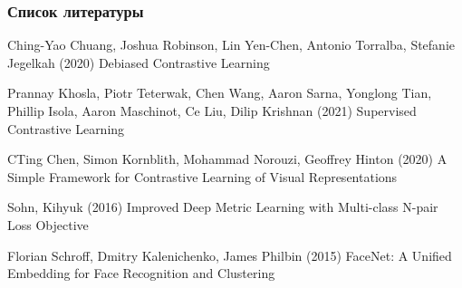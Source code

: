 \documentclass[
	11pt, %
]{beamer}
\begin{document}
\begin{frame} 
	\frametitle{Список литературы}
	
	\begin{thebibliography}{99} 
		\footnotesize
		
			Ching-Yao Chuang, Joshua Robinson, Lin Yen-Chen, Antonio Torralba, Stefanie Jegelkah (2020)
			\newblock Debiased Contrastive Learning

			Prannay Khosla, Piotr Teterwak, Chen Wang, Aaron Sarna, Yonglong Tian, Phillip Isola, Aaron Maschinot, Ce Liu, Dilip Krishnan (2021)
			\newblock Supervised Contrastive Learning

			CTing Chen, Simon Kornblith, Mohammad Norouzi, Geoffrey Hinton (2020)
			\newblock A Simple Framework for Contrastive Learning of Visual Representations

			Sohn, Kihyuk (2016)
			\newblock Improved Deep Metric Learning with Multi-class N-pair Loss Objective

			Florian Schroff, Dmitry Kalenichenko, James Philbin (2015)
			\newblock FaceNet: A Unified Embedding for Face Recognition and Clustering

	\end{thebibliography}
\end{frame}
\end{document}
